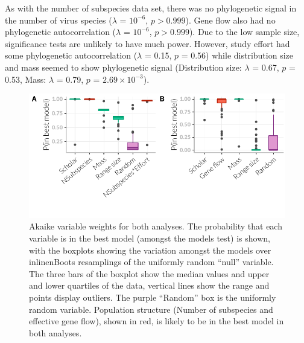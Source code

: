 As with the number of subspecies data set, there was no phylogenetic signal in the number of virus species ($\lambda$ = \ensuremath{10^{-6}}, $p > 0.999$).
Gene flow also had no phylogenetic autocorrelation ($\lambda$ = \ensuremath{10^{-6}},  $p > 0.999$).
Due to the low sample size, significance tests are unlikely to have much power.
However, study effort had some phylogenetic autocorrelation ($\lambda$ = 0.15, $p$ = 0.56) while distribution size and mass seemed to show phylogenetic signal (Distribution size: $\lambda$ = 0.67, $p$ = 0.53, Mass: $\lambda$ = 0.79, $p$ = \ensuremath{2.69\times 10^{-3}}).


\begin{knitrout}\footnotesize
{}\color{fgcolor}\begin{figure}[t]

{\centering \includegraphics[width=\textwidth,trim = 0 1cm 0 0]{figure/fstITPlots-1} 

}

\caption[Akaike variable weights for $F_{ST}$ analysis.]{Akaike variable weights for both analyses. The probability that each variable is in the best model (amongst the models test) is shown, with the boxplots showing the variation amongst the models over 
inline{nBoots} resamplings of the uniformly random ``null'' variable. The three bars of the boxplot show the median values and upper and lower quartiles of the data, vertical lines show the range and points display outliers. The purple ``Random'' box is the uniformly random variable. Population structure (Number of subspecies and effective gene flow), shown in red, is likely to be in the best model in both analyses.}\label{fig:fstITPlots}
\end{figure}


\end{knitrout}



